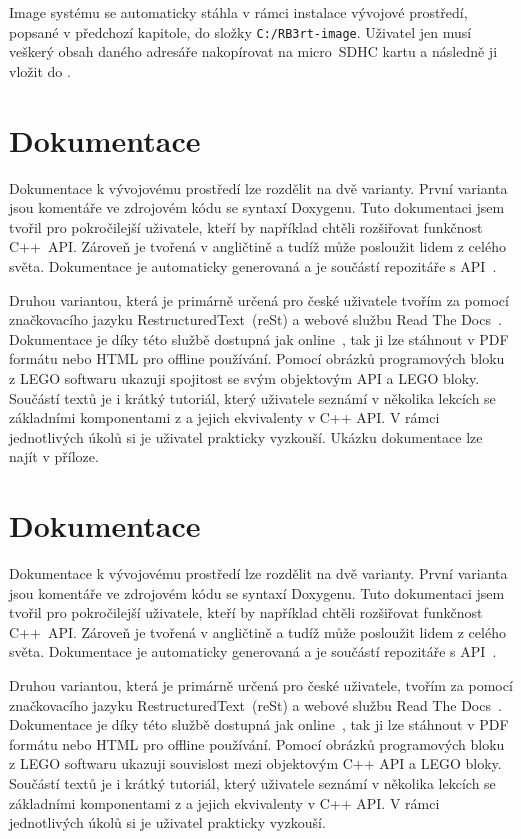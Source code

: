 Image systému se automaticky stáhla v rámci instalace vývojové prostředí, popsané v předchozí kapitole, do složky \texttt{C:/RB3rt-image}. 
Uživatel jen musí veškerý obsah daného adresáře nakopírovat na micro~SDHC kartu a následně ji vložit do .


\section{Dokumentace}

Dokumentace k vývojovému prostředí lze rozdělit na dvě varianty. 
První varianta jsou komentáře ve zdrojovém kódu se syntaxí Doxygenu.
Tuto dokumentaci jsem tvořil pro pokročilejší uživatele, kteří by například chtěli rozšiřovat funkčnost C++~API. 
Zároveň je tvořená v angličtině a tudíž může posloužit lidem z celého světa.
Dokumentace je automaticky generovaná a je součástí repozitáře s API~\cite{roboticsbrno-EV3RT-API-Reference}.
     
Druhou variantou, která je primárně určená pro české uživatele tvořím za pomocí značkovacího jazyku RestructuredText~(reSt) a webové službu Read The Docs~\cite{readthedocs}.
Dokumentace je díky této službě dostupná jak online~\cite{readthedocs-rb3rt}, tak ji lze stáhnout v PDF formátu nebo HTML pro offline používání.
Pomocí obrázků programových bloku z LEGO softwaru ukazuji spojitost se svým objektovým API a LEGO bloky.
Součástí textů je i krátký tutoriál, který uživatele seznámí v několika lekcích se základními komponentami z \legoEV{} a jejich ekvivalenty v C++ API. 
V rámci jednotlivých úkolů si je uživatel prakticky vyzkouší.
Ukázku dokumentace lze najít v příloze.





\section{Dokumentace}

Dokumentace k vývojovému prostředí lze rozdělit na dvě varianty. 
První varianta jsou komentáře ve zdrojovém kódu se syntaxí Doxygenu.
Tuto dokumentaci jsem tvořil pro pokročilejší uživatele, kteří by například chtěli rozšiřovat funkčnost C++~API. 
Zároveň je tvořená v angličtině a tudíž může posloužit lidem z celého světa.
Dokumentace je automaticky generovaná a je součástí repozitáře s API~\cite{roboticsbrno-EV3RT-API-Reference}.
     
Druhou variantou, která je primárně určená pro české uživatele, tvořím za pomocí značkovacího jazyku RestructuredText~(reSt) a webové službu Read The Docs~\cite{readthedocs}.
Dokumentace je díky této službě dostupná jak online~\cite{readthedocs-rb3rt}, tak ji lze stáhnout v PDF formátu nebo HTML pro offline používání.
Pomocí obrázků programových bloku z LEGO softwaru ukazuji souvislost mezi objektovým C++ API a LEGO bloky.
Součástí textů je i krátký tutoriál, který uživatele seznámí v několika lekcích se základními komponentami z \legoEV{} a jejich ekvivalenty v C++ API. 
V rámci jednotlivých úkolů si je uživatel prakticky vyzkouší.

